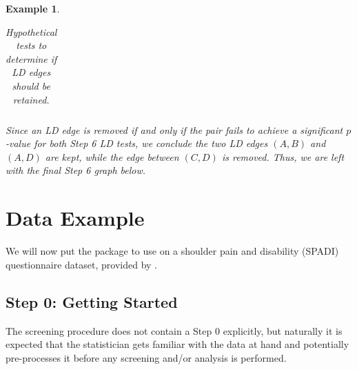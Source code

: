 \documentclass[a4project,12pt]{article}
\theoremstyle{examplestyle}
\newtheorem{example}{Example}[section]
\theoremstyle{defstyle}
\theoremstyle{thmstyle}
\begin{document}
\begin{mybox3}
\begin{example}
\begin{table}[H]
\begin{tabular}{c c c c}
            \hline  
            \end{tabular}
            \caption{Hypothetical tests to determine if LD edges should be retained.}
            \label{tab:step3_example_3b}
        \end{table}
    Since an LD edge is removed if and only if the pair fails to achieve a significant $p$-value for both Step 6 LD tests, we conclude the two LD edges $(A,B)$ and $(A,D)$ are kept, while the edge between $(C,D)$ is removed. Thus, we are left with the final Step 6 graph below.
    \begin{center}
\end{center}
    \end{example}
\end{mybox3}



\section{Data Example}
We will now put the package to use on a shoulder pain and disability (SPADI) questionnaire dataset, provided by \cite{christensen-2018}. 

\subsection{Step 0: Getting Started}
The screening procedure does not contain a Step $0$ explicitly, but naturally it is expected that the statistician gets familiar with the data at hand and potentially pre-processes it before any screening and/or analysis is performed.
\end{document}
